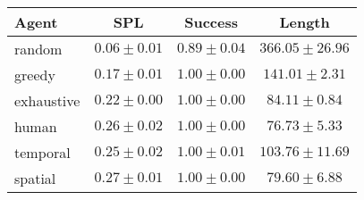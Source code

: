 \begin{tabular}{lccc}
    \toprule
    Agent & SPL & Success & Length \\
    \midrule
    random & $0.06 \pm 0.01$ & $0.89 \pm 0.04$ & $366.05 \pm 26.96$\\
    greedy & $0.17 \pm 0.01$ & $1.00 \pm 0.00$ & $141.01 \pm 2.31$\\
    exhaustive & $0.22 \pm 0.00$ & $1.00 \pm 0.00$ & $84.11 \pm 0.84$\\
    human & $0.26 \pm 0.02$ & $1.00 \pm 0.00$ & $76.73 \pm 5.33$\\
    temporal & $0.25 \pm 0.02$ & $1.00 \pm 0.01$ & $103.76 \pm 11.69$\\
    spatial & $0.27 \pm 0.01$ & $1.00 \pm 0.00$ & $79.60 \pm 6.88$\\
    \bottomrule
\end{tabular}